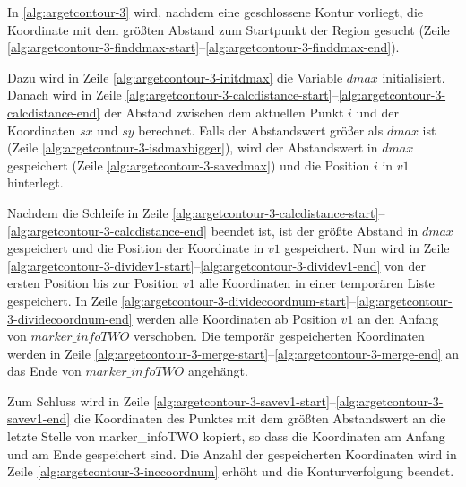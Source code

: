 In \autoref{alg:argetcontour-3} wird, nachdem eine geschlossene Kontur vorliegt, die Koordinate mit dem größten Abstand
 zum Startpunkt der Region gesucht (Zeile
 \ref{alg:argetcontour-3-finddmax-start}--\ref{alg:argetcontour-3-finddmax-end}).



Dazu wird in Zeile \ref{alg:argetcontour-3-initdmax} die Variable $\mathit{dmax}$ initialisiert. Danach wird in Zeile
 \ref{alg:argetcontour-3-calcdistance-start}--\ref{alg:argetcontour-3-calcdistance-end} der Abstand zwischen dem
 aktuellen Punkt $i$ und der Koordinaten $\mathit{sx}$ und $\mathit{sy}$ berechnet. Falls der Abstandswert größer als
 $\mathit{dmax}$ ist (Zeile \ref{alg:argetcontour-3-isdmaxbigger}), wird der Abstandswert in $\mathit{dmax}$
 gespeichert (Zeile \ref{alg:argetcontour-3-savedmax}) und die Position $i$ in $\mathit{v1}$ hinterlegt.

Nachdem die Schleife in Zeile \ref{alg:argetcontour-3-calcdistance-start}--\ref{alg:argetcontour-3-calcdistance-end}
 beendet ist, ist der größte Abstand in $\mathit{dmax}$ gespeichert und die Position der Koordinate in $\mathit{v1}$
 gespeichert. Nun wird in Zeile \ref{alg:argetcontour-3-dividev1-start}--\ref{alg:argetcontour-3-dividev1-end} von der
 ersten Position bis zur Position $\mathit{v1}$ alle Koordinaten in einer temporären Liste gespeichert. In Zeile
 \ref{alg:argetcontour-3-dividecoordnum-start}--\ref{alg:argetcontour-3-dividecoordnum-end} werden alle Koordinaten ab
 Position $\mathit{v1}$ an den Anfang von $\mathit{marker\_infoTWO}$ verschoben. Die temporär gespeicherten Koordinaten
 werden in Zeile \ref{alg:argetcontour-3-merge-start}--\ref{alg:argetcontour-3-merge-end} an das Ende von
 $\mathit{marker\_infoTWO}$ angehängt.

Zum Schluss wird in Zeile \ref{alg:argetcontour-3-savev1-start}--\ref{alg:argetcontour-3-savev1-end} die Koordinaten
 des Punktes mit dem größten Abstandswert an die letzte Stelle von marker\_infoTWO kopiert, so dass die Koordinaten am
 Anfang und am Ende gespeichert sind. Die Anzahl der gespeicherten Koordinaten wird in Zeile
 \ref{alg:argetcontour-3-inccoordnum} erhöht und die Konturverfolgung beendet.

